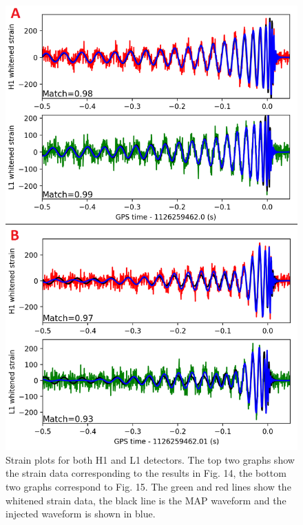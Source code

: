 \documentclass[11pt]{article}
\begin{document}
\begin{figure}[h]
	\includegraphics[scale=0.3]{fig16.png}
	\centering
	\caption{Strain plots for both H1 and L1 detectors. The top two graphs show the strain data corresponding to the results in Fig. 14, the bottom two graphs correspond to Fig. 15. The green and red lines show the whitened strain data, the black line is the MAP waveform and the injected waveform is shown in blue.}
	\centering
\end{figure}
\end{document}
